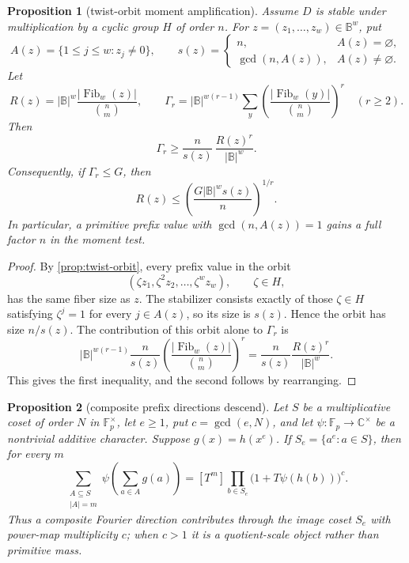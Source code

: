 \documentclass[a4paper,11pt]{amsart}
\newtheorem{proposition}[proposition]{Proposition}
\theoremstyle{remark}
\newcommand{\F}{\mathbb F}
\newcommand{\B}{\mathbb B}
\newcommand{\Fib}{\operatorname{Fib}}
\begin{document}
\begin{proposition}[twist-orbit moment amplification]\label{prop:q-orbit-moment}
Assume \(D\) is stable under multiplication by a cyclic group \(H\) of order \(n\).  For \(z=(z_1,\ldots,z_w)\in\B^w\), put
\[
        A(z)=\{1\le j\le w:z_j\ne0\},
        \qquad
        s(z)=
        \begin{cases}
        n, & A(z)=\varnothing,\\
        \gcd(n,A(z)), & A(z)\ne\varnothing .
        \end{cases}
\]
Let
\[
        R(z)=|\B|^w \frac{|\Fib_w(z)|}{\binom nm},
        \qquad
        \Gamma_r=|\B|^{w(r-1)}
        \sum_y\left(\frac{|\Fib_w(y)|}{\binom nm}\right)^r
        \quad(r\ge2).
\]
Then
\[
        \Gamma_r\ge \frac{n}{s(z)}\,\frac{R(z)^r}{|\B|^w}.
\]
Consequently, if \(\Gamma_r\le G\), then
\[
        R(z)\le\left(\frac{G|\B|^w s(z)}{n}\right)^{1/r}.
\]
In particular, a primitive prefix value with \(\gcd(n,A(z))=1\) gains a full factor \(n\) in the moment test.
\end{proposition}

\begin{proof}
By \cref{prop:twist-orbit}, every prefix value in the orbit
\[
        (\zeta z_1,\zeta^2z_2,\ldots,\zeta^wz_w),
        \qquad \zeta\in H,
\]
has the same fiber size as \(z\).  The stabilizer consists exactly of those \(\zeta\in H\) satisfying \(\zeta^j=1\) for every \(j\in A(z)\), so its size is \(s(z)\).  Hence the orbit has size \(n/s(z)\).  The contribution of this orbit alone to \(\Gamma_r\) is
\[
        |\B|^{w(r-1)}\frac{n}{s(z)}
        \left(\frac{|\Fib_w(z)|}{\binom nm}\right)^r
        =
        \frac{n}{s(z)}\frac{R(z)^r}{|\B|^w}.
\]
This gives the first inequality, and the second follows by rearranging.
\end{proof}

\begin{proposition}[composite prefix directions descend]\label{prop:composite-descend}
Let \(S\) be a multiplicative coset of order \(N\) in \(\F_p^\times\), let \(e\ge1\), put \(c=\gcd(e,N)\), and let \(\psi:\F_p\to\mathbb C^\times\) be a nontrivial additive character.  Suppose \(g(x)=h(x^e)\).  If \(S_e=\{a^e:a\in S\}\), then for every \(m\)
\[
        \sum_{\substack{A\subseteq S\\ |A|=m}}
        \psi\!\left(\sum_{a\in A}g(a)\right)
        =
        [T^m]\prod_{b\in S_e}\bigl(1+T\psi(h(b))\bigr)^c .
\]
Thus a composite Fourier direction contributes through the image coset \(S_e\)
with power-map multiplicity \(c\); when \(c>1\) it is a quotient-scale object
rather than primitive mass.
\end{proposition}
\end{document}
